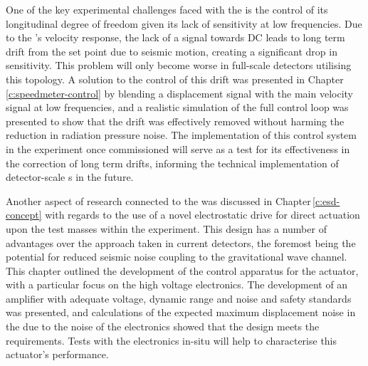 One of the key experimental challenges faced with the \SSM{} is the control of its longitudinal degree of freedom given its lack of sensitivity at low frequencies. Due to the \SM{}'s velocity response, the lack of a signal towards \gls{DC} leads to long term drift from the set point due to seismic motion, creating a significant drop in sensitivity. This problem will only become worse in full-scale detectors utilising this topology. A solution to the control of this drift was presented in Chapter\,\ref{c:speedmeter-control} by blending a displacement signal with the main velocity signal at low frequencies, and a realistic simulation of the full control loop was presented to show that the drift was effectively removed without harming the reduction in radiation pressure noise. The implementation of this control system in the experiment once commissioned will serve as a test for its effectiveness in the correction of long term drifts, informing the technical implementation of detector-scale \SM{}s in the future.

Another aspect of research connected to the \SSM{} was discussed in Chapter\,\ref{c:esd-concept} with regards to the use of a novel electrostatic drive for direct actuation upon the test masses within the experiment. This design has a number of advantages over the approach taken in current detectors, the foremost being the potential for reduced seismic noise coupling to the gravitational wave channel. This chapter outlined the development of the control apparatus for the actuator, with a particular focus on the high voltage electronics. The development of an amplifier with adequate voltage, dynamic range and noise and safety standards was presented, and calculations of the expected maximum displacement noise in the \SSMEXPT{} due to the noise of the electronics showed that the design meets the requirements. Tests with the electronics in-situ will help to characterise this actuator's performance.


